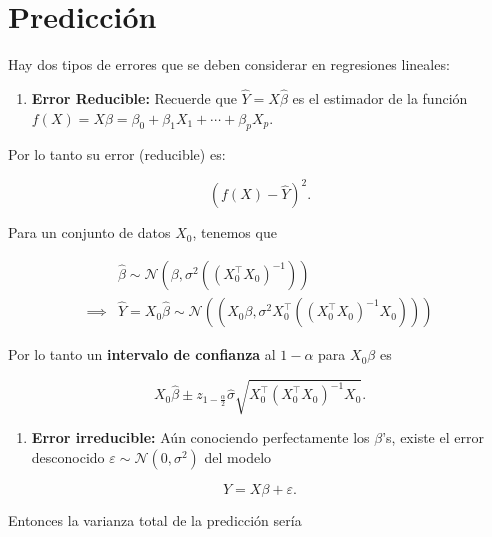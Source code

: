 \documentclass[
  12pt,
]{book}
\providecommand{\tightlist}{%
  \setlength{\itemsep}{0pt}\setlength{\parskip}{0pt}}
\theoremstyle{definition}
\theoremstyle{definition}
\theoremstyle{definition}
\theoremstyle{definition}
\theoremstyle{remark}
\begin{document}
\hypertarget{predicciuxf3n}{%
\section{Predicción}\label{predicciuxf3n}}

Hay dos tipos de errores que se deben considerar en regresiones lineales:

\begin{enumerate}
\def\labelenumi{\arabic{enumi}.}
\tightlist
\item
  \textbf{Error Reducible:} Recuerde que \(\hat{Y} = X\hat{\beta}\) es el estimador de la función \(f(X)=X\beta = \beta_{0} + \beta_{1}X_{1}+\cdots+\beta_{p}X_{p}\).
\end{enumerate}

Por lo tanto su error (reducible) es:

\begin{equation*}
\left(  f(X) - \hat{Y}\right) ^{2}. 
\end{equation*}

Para un conjunto de datos \(X_{0}\), tenemos que

\begin{align*}
 & \hat{\beta} \sim  \mathcal{N}\left(\beta, \sigma^{2}\left( (X_{0}^{\top}X_{0})^{-1} \right)\right) \\
 \implies & \hat{Y} = X_{0}\hat{\beta} \sim \mathcal{N}\left((X_{0}\beta,\sigma^{2}X_{0}^{\top}((X_{0}^{\top}X_{0})^{-1}X_{0})) \right)
\end{align*}

Por lo tanto un \textbf{intervalo de confianza} al \(1-\alpha\) para \(X_0\beta\) es

\begin{equation*}
X_{0}\hat \beta \pm z_{1-\frac{\alpha}{2}} \hat{\sigma} \sqrt{X_{0}^{\top}(X_{0}^{\top}X_{0})^{-1}X_{0}}.
\end{equation*}

\begin{enumerate}
\def\labelenumi{\arabic{enumi}.}
\setcounter{enumi}{1}
\tightlist
\item
  \textbf{Error irreducible:} Aún conociendo perfectamente los \(\beta\)'s, existe el error desconocido \(\varepsilon\sim \mathcal{N}\left(0,\sigma^{2}\right)\) del modelo
\end{enumerate}

\begin{equation*}
Y = X\beta + \varepsilon.
\end{equation*}

Entonces la varianza total de la predicción sería
\end{document}

